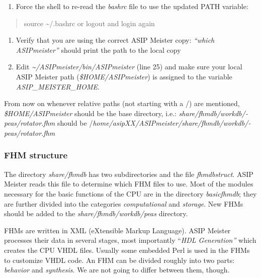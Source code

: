 \documentclass[
]{article}
\begin{document}
\begin{enumerate}
\def\labelenumi{\arabic{enumi}.}
\setcounter{enumi}{2}
\item
  Force the shell to re-read the \emph{bashrc} file to use the updated
  PATH variable:
\end{enumerate}

\begin{quote}
source \textasciitilde/.bashrc or logout and login again
\end{quote}

\begin{enumerate}
\def\labelenumi{\arabic{enumi}.}
\setcounter{enumi}{3}
\item
  Verify that you are using the correct ASIP Meister copy: \emph{``which
  ASIPmeister''} should print the path to the local copy
\item
  Edit \emph{\textasciitilde/ASIPmeister/bin/ASIPmeister} (line 25) and
  make sure your local ASIP Meister path (\emph{\$HOME/ASIPmeister}) is
  assigned to the variable \emph{ASIP\_MEISTER\_HOME}.
\end{enumerate}

From now on whenever relative paths (not starting with a /) are
mentioned, \emph{\$HOME/ASIPmeister} should be the base directory, i.e.:
\emph{share/­fhmdb/­workdb/­peas/­rotator.fhm} should be
/\emph{home/­asipXX/­ASIPmeister/­share/­fhmdb/­workdb/­peas/­rotator.fhm}

\hypertarget{fhm-structure}{%
\subsubsection{FHM structure}\label{fhm-structure}}

The directory \emph{share/fhmdb} has two subdirectories and the file
\emph{fhmdbstruct}. ASIP Meister reads this file to determine which FHM
files to use. Most of the modules necessary for the basic functions of
the CPU are in the directory \emph{basicfhmdb}; they are further divided
into the categories \emph{computational} and \emph{storage}. New FHMs
should be added to the \emph{share/­fhmdb/­workdb/­peas} directory.

FHMs are written in XML (eXtensible Markup Language). ASIP Meister
processes their data in several stages, most importantly ``\emph{HDL
Generation''} which creates the CPU VHDL files. Usually some embedded
Perl is used in the FHMs to customize VHDL code. An FHM can be divided
roughly into two parts: \emph{behavior} and \emph{synthesis}. We are not
going to differ between them, though.
\end{document}
